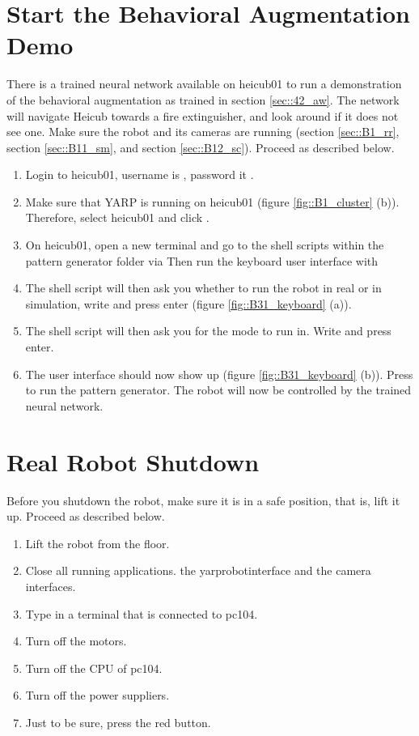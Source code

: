 \section{Start the Behavioral Augmentation Demo}
\label{sec::B4_ba}
There is a trained neural network available on heicub01 to run a demonstration of the behavioral augmentation as trained in section \ref{sec::42_aw}. The network will navigate Heicub towards a fire extinguisher, and look around if it does not see one. Make sure the robot and its cameras are running (section \ref{sec::B1_rr}, section \ref{sec::B11_sm}, and section \ref{sec::B12_sc}). Proceed as described below.
\begin{enumerate}
	\item Login to heicub01, username is , password it .
	\item Make sure that YARP is running on heicub01 (figure \ref{fig::B1_cluster} (b)). Therefore, select heicub01 and click .
	\item On heicub01, open a new terminal and go to the shell scripts within the pattern generator folder via \newline {}
	\newline Then run the keyboard user interface with
	\newline {}
	\item The shell script will then ask you whether to run the robot in real or in simulation, write  and press enter (figure \ref{fig::B31_keyboard} (a)).
	\item The shell script will then ask you for the mode to run in. Write  and press enter.
	\item The user interface should now show up (figure \ref{fig::B31_keyboard} (b)). Press  to run the pattern generator. The robot will now be controlled by the trained neural network.
\end{enumerate}
\FloatBarrier
\section{Real Robot Shutdown}
Before you shutdown the robot, make sure it is in a safe position, that is, lift it up. Proceed as described below.
\begin{enumerate}
	\item Lift the robot from the floor.
	\item Close all running applications.  the yarprobotinterface and the camera interfaces.
	\item Type  in a terminal that is connected to pc104.
	\item Turn off the motors.
	\item Turn off the CPU of pc104.
	\item Turn off the power suppliers.
	\item Just to be sure, press the red button.
\end{enumerate}
